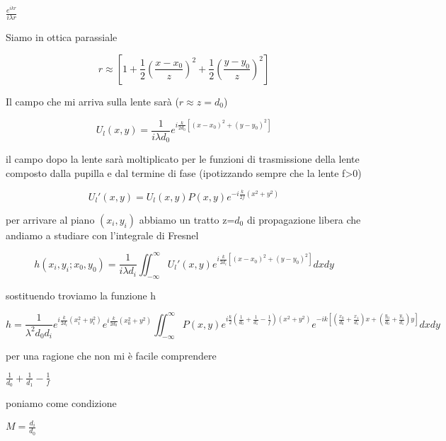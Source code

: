 \documentclass{article}
\begin{document}
$\frac{e^{i k r}}{ i \lambda r}$

Siamo in ottica parassiale 

\begin{equation}
r \approx [1 + \frac{1}{2} (\frac{x - x_{0}}{z})^{2}+ \frac{1}{2} (\frac{y - y_{0}}{z})^{2}]
\end{equation}

Il campo che mi arriva sulla lente sarà ($ r \approx z = d_{0}$)





\begin{equation}
U_{l}(x,y) =\frac{1}{i \lambda d_{0}} e^{i \frac{k}{2 d_{0}}  [(x-x_{0})^{2} +(y-y_{0})^{2}]}
\end{equation}

il campo dopo la lente sarà moltiplicato per le funzioni di trasmissione della lente composto dalla pupilla e dal termine di fase (ipotizzando sempre che la lente f>0)

\begin{equation}
U_{l}' (x,y)=U_{l}(x,y) P(x,y) e^{-i \frac{k}{2f}(x^{2}+y^{2})}
\end{equation}

per arrivare al piano $(x_{i}, y_{i})$ abbiamo un tratto z=$d_{0}$ di propagazione libera che andiamo a studiare con l'integrale di Fresnel

\begin{equation}
h(x_{i}, y_{i}; x_{0}, y_{0})= \frac{1}{ i \lambda d_{i}} \iint_{-\infty}^{\infty} U_{l}' (x,y) e^{i \frac{k}{2 d_{i}}[(x-x_{0})^{2} +(y-y_{0})^{2}]}dxdy
\end{equation}


sostituendo troviamo la funzione h

\begin{equation}
h= \frac{1}{\lambda^{2} d_{0} d_{i}} e ^{i \frac{k}{2 d_{i}}(x_{i}^{2}+y_{i}^{2})} e ^{i \frac{k}{2 d_{0}}(x_{0}^{2}+y_{}^{2})} \iint_{-\infty}^{\infty} P(x,y) e^{i \frac{k}{2}  (\frac{1}{d_{0}} + \frac{1}{d_{1}} - \frac{1}{f})(x^{2}+y^{2}) } e^{- i k [(\frac{x_{0}}{d_{0}} + \frac{x_{1}}{d_{1}} ) x + (\frac{y_{0}}{d_{0}} + \frac{y_{1}}{d_{1}} ) y]} dxdy
\end{equation}


per una ragione che non mi è facile comprendere 

$\frac{1}{d_{0}}+ \frac{1}{d_{1}} - \frac{1}{f}$

poniamo come condizione

$M = \frac{d_{i}}{d_{0}}$
\end{document}
